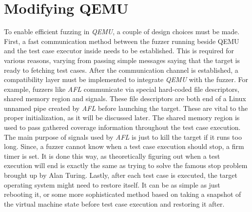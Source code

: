 \cleardoublepage
\section{Modifying QEMU} \label{chap:qemu}

To enable efficient fuzzing in \textit{QEMU}, a couple of design choices must be made. First, a fast communication method between the fuzzer running beside QEMU and the test case executor inside needs to be established. This is required for various reasons, varying from passing simple messages saying that the target is ready to fetching test cases. After the communication channel is established, a compatibility layer must be implemented to integrate \textit{QEMU} with the fuzzer. For example, fuzzers like \textit{AFL} communicate via special hard-coded file descriptors, shared memory region and signals. These file descriptors are both end of a Linux unnamed pipe created by \textit{AFL} before launching the target. These are vital to the proper initialization, as it will be discussed later. The shared memory region is used to pass gathered coverage information throughout the test case execution. The main purpose of signals used by \textit{AFL} is just to kill the target if it runs too long. Since, a fuzzer cannot know when a test case execution should stop, a firm timer is set. It is done this way, as theoretically figuring out when a test execution will end is exactly the same as trying to solve the famous stop problem brought up by Alan Turing. Lastly, after each test case is executed, the target operating system might need to restore itself. It can be as simple as just rebooting it, or some more sophisticated method based on taking a snapshot of the virtual machine state before test case execution and restoring it after.

